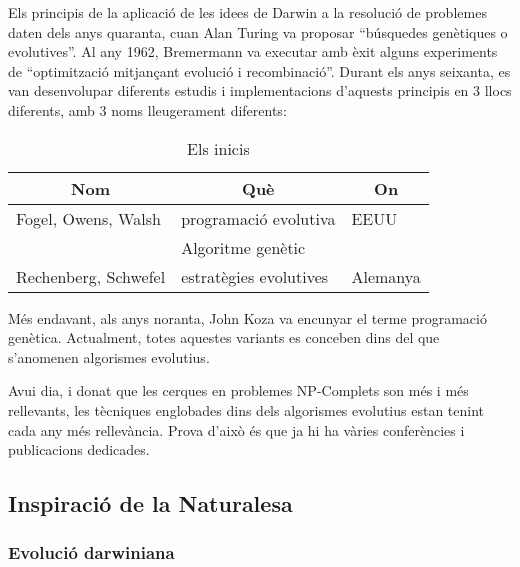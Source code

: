 Els principis de la aplicació de les idees de Darwin a la resolució de problemes
daten dels anys quaranta, cuan Alan Turing va proposar ``búsquedes genètiques o
evolutives''.  Al any 1962, Bremermann va executar amb èxit alguns experiments
de ``optimització mitjançant evolució i recombinació''.  Durant els anys
seixanta, es van desenvolupar diferents estudis i implementacions d'aquests
principis en 3 llocs diferents, amb 3 noms lleugerament diferents:


\begin{table}
\centering
\caption{Els inicis}
\begin{tabular}{|l|l|l|}
\hline
\multicolumn{1}{|c|}{\textbf{Nom }} & \multicolumn{1}{c|}{\textbf{ Què }} & \multicolumn{1}{c|}{\textbf{ On}} \\
\hline
\hline
Fogel, Owens, Walsh  & programació evolutiva  & EEUU     \\
                     & Algoritme genètic      &   \\
Rechenberg, Schwefel & estratègies evolutives & Alemanya \\
\hline
\end{tabular}
\end{table}

Més endavant, als anys noranta, John Koza va encunyar el terme programació
genètica.  Actualment, totes aquestes variants es conceben dins del que
s'anomenen algorismes evolutius.


Avui dia, i donat que les cerques en problemes NP-Complets son més i més
rellevants, les tècniques englobades dins dels algorismes evolutius estan tenint
cada any més rellevància.  Prova d'això és que ja hi ha vàries conferències
i publicacions dedicades.

\subsection{Inspiració de la Naturalesa} %
\label{sub:Inspiracio de la Naturalesa}

\subsubsection{Evolució darwiniana} %
\label{ssub:Evolucio darwiniana}


